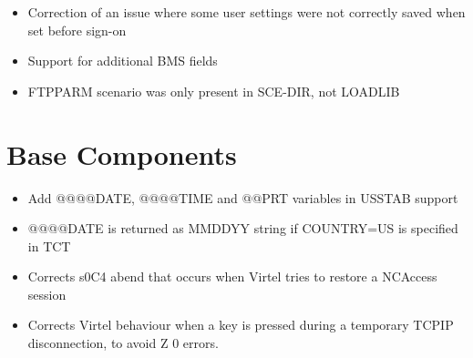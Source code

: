 \documentclass[letterpaper,10pt,english]{sphinxmanual}
\begin{document}
\begin{itemize}
\item {} 
Correction of an issue where some user settings were not correctly saved when set before sign-on

\end{itemize}

\begin{itemize}
\item {} 
Support for additional BMS fields

\end{itemize}

\begin{itemize}
\item {} 
FTPPARM scenario was only present in SCE-DIR, not LOADLIB

\end{itemize}

\newpage


\section{Base Components}
\label{\detokenize{TN202003:base-components}}
\begin{itemize}
\item {} 
Add @@@@DATE, @@@@TIME and @@PRT variables in USSTAB support

\end{itemize}

\begin{itemize}
\item {} 
@@@@DATE is returned as MMDDYY string if COUNTRY=US is specified in TCT

\end{itemize}

\begin{itemize}
\item {} 
Corrects s0C4 abend that occurs when Virtel tries to restore a NCAccess session

\end{itemize}

\begin{itemize}
\item {} 
Corrects Virtel behaviour when a key is pressed during a temporary TCPIP disconnection, to avoid Z 0 errors.

\end{itemize}
\end{document}

